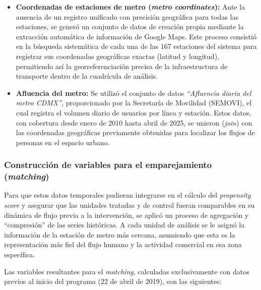 \begin{itemize}
    \item \textbf{Coordenadas de estaciones de metro (\textit{metro coordinates}):} 
    Ante la ausencia de un registro unificado con precisión geográfica para todas las estaciones, se generó un conjunto de datos de creación propia mediante la extracción automática de información de Google Maps. Este proceso consistió en la búsqueda sistemática de cada una de las 167 estaciones del sistema para registrar sus coordenadas geográficas exactas (latitud y longitud), permitiendo así la georreferenciación precisa de la infraestructura de transporte dentro de la cuadrícula de análisis.

    \item \textbf{Afluencia del metro:} 
    Se utilizó el conjunto de datos \textit{``Afluencia diaria del metro CDMX''}, proporcionado por la Secretaría de Movilidad (SEMOVI), el cual registra el volumen diario de usuarios por línea y estación. Estos datos, con cobertura desde enero de 2010 hasta abril de 2025, se unieron (\textit{join}) con las coordenadas geográficas previamente obtenidas para localizar los flujos de personas en el espacio urbano.
\end{itemize}

\subsubsection{Construcción de variables para el emparejamiento (\textit{matching})}

Para que estos datos temporales pudieran integrarse en el cálculo del \textit{propensity score} y asegurar que las unidades tratadas y de control fueran comparables en su dinámica de flujo previa a la intervención, se aplicó un proceso de agregación y ``compresión'' de las series históricas. A cada unidad de análisis se le asignó la información de la estación de metro más cercana, asumiendo que esta es la representación más fiel del flujo humano y la actividad comercial en esa zona específica.

Las variables resultantes para el \textit{matching}, calculadas exclusivamente con datos previos al inicio del programa (22 de abril de 2019), son las siguientes:

